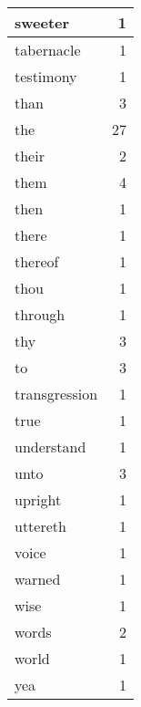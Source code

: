 \begin{center}
\begin{longtable}{l|r}
sweeter & 1 \\ \hline
tabernacle & 1 \\ \hline
testimony & 1 \\ \hline
than & 3 \\ \hline
the & 27 \\ \hline
their & 2 \\ \hline
them & 4 \\ \hline
then & 1 \\ \hline
there & 1 \\ \hline
thereof & 1 \\ \hline
thou & 1 \\ \hline
through & 1 \\ \hline
thy & 3 \\ \hline
to & 3 \\ \hline
transgression & 1 \\ \hline
true & 1 \\ \hline
understand & 1 \\ \hline
unto & 3 \\ \hline
upright & 1 \\ \hline
uttereth & 1 \\ \hline
voice & 1 \\ \hline
warned & 1 \\ \hline
wise & 1 \\ \hline
words & 2 \\ \hline
world & 1 \\ \hline
yea & 1 \\ \hline
\end{longtable}
\end{center}



\normalsize



